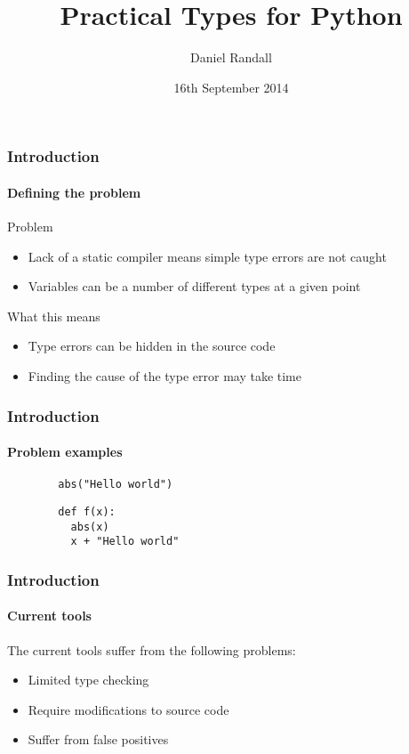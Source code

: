 \documentclass{beamer}
\title{Practical Types for Python}
\author{Daniel Randall}
\institute{Imperial College London} %
\date{16th September 2014}
\begin{document}
	\frame{\titlepage}

\begin{frame}
    \frametitle{Introduction}
   	\framesubtitle{Defining the problem}
   	\begin{block}{Problem}
   		\begin{itemize}
   		  \item Lack of a static compiler means simple type errors are not caught
   		  \item Variables can be a number of different types at a given point
   		\end{itemize}
   	\end{block}

	\begin{block}{What this means}
		\begin{itemize}
		  \item Type errors can be hidden in the source code
		  \item Finding the cause of the type error may take time
		\end{itemize}
   	\end{block}
\end{frame}	
	
\begin{frame}[fragile]
    \frametitle{Introduction}
   	\framesubtitle{Problem examples}
   	\begin{block}{}
   	\begin{lstlisting}
        abs("Hello world")
    \end{lstlisting}
    \end{block}
    \begin{block}{}
    \begin{lstlisting}
        def f(x):
          abs(x)
          x + "Hello world"
    \end{lstlisting}
    \end{block}
\end{frame}
  
  \begin{frame}
    \frametitle{Introduction}
   	\framesubtitle{Current tools}
   	The current tools  suffer from the following problems:
   	\begin{itemize}
    		\item Limited type checking
    		\item Require modifications to source code
    		\item Suffer from false positives
    \end{itemize}
  \end{frame}
  
\end{document}
